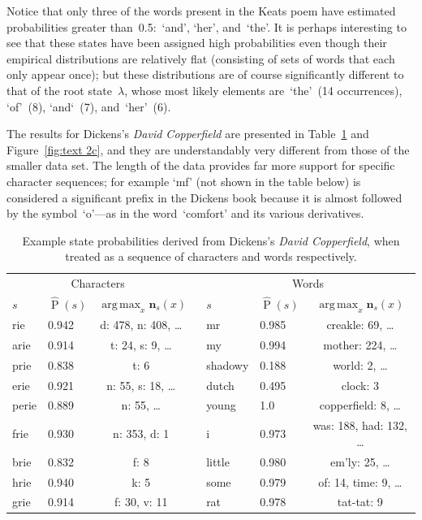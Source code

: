 \documentclass[11pt,a4paper]{article}
\newcommand\ub[1]{\symbf{#1}}                 %
\DeclareMathOperator\Pb{P}                    %
\DeclareMathOperator*{\argmax}{arg\,max}
\begin{document}
Notice that only three of the words present in the Keats poem have estimated
probabilities greater than~0.5:~`and', `her', and~`the'. It is perhaps
interesting to see that these states have been assigned high probabilities even
though their empirical distributions are relatively flat (consisting of sets of
words that each only appear once); but these distributions are of course
significantly different to that of the root state~\(\lambda\), whose most likely
elements are~`the'~(14 occurrences), `of'~(8), `and`~(7), and~`her'~(6).

The results for Dickens's \textit{David Copperfield} are presented in
Table~\ref{tab:text 2} and Figure~\ref{fig:text 2c}, and they are understandably
very different from those of the smaller data set. The length of the data
provides far more support for specific character sequences; for example `mf'
(not shown in the table below) is considered a significant prefix in the Dickens
book because it is almost followed by the symbol~`o'---as in the word~`comfort'
and its various derivatives.
%
\begin{table}[htbp]
\centering
\begin{tabular}{llccllc}
  \toprule
  \multicolumn{3}{c}{Characters} && \multicolumn{3}{c}{Words} \\
  \cmidrule{1-3} \cmidrule{5-7}
  \(s\) & \(\hat{\Pb}(s)\) & \(\argmax_x \ub{n}_s(x)\) &&
  \(s\) & \(\hat{\Pb}(s)\) & \(\argmax_x \ub{n}_s(x)\) \\
  \midrule
  rie   & 0.942 & d: 478, n: 408, \dots && mr      & 0.985 & creakle: 69, \dots \\
  arie  & 0.914 & t: 24, s: 9, \dots    && my      & 0.994 & mother: 224, \dots \\
  prie  & 0.838 & t: 6                  && shadowy & 0.188 & world: 2, \dots \\
  erie  & 0.921 & n: 55, s: 18, \dots   && dutch   & 0.495 & clock: 3 \\
  perie & 0.889 & n: 55, \dots          && young   & 1.0   & copperfield: 8, \dots \\
  frie  & 0.930 & n: 353, d: 1          && i       & 0.973 & was: 188, had: 132, \dots \\
  brie  & 0.832 & f: 8                  && little  & 0.980 & em’ly: 25, \dots \\
  hrie  & 0.940 & k: 5                  && some    & 0.979 & of: 14, time: 9, \dots \\
  grie  & 0.914 & f: 30, v: 11          && rat     & 0.978 & tat-tat: 9 \\
  \bottomrule
\end{tabular}
\caption{Example state probabilities derived from Dickens's \textit{David
  Copperfield}, when treated as a sequence of characters and words respectively.}
\label{tab:text 2}
\end{table}
\end{document}
